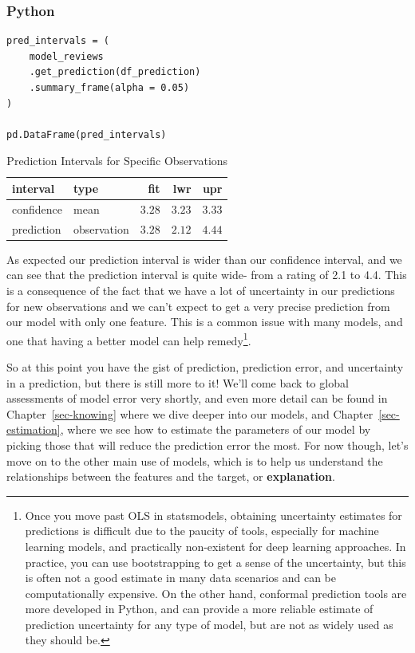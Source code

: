 \documentclass[
  letterpaper,
]{krantz}
\begin{document}
\subsubsection{Python}

\begin{verbatim}
pred_intervals = (
    model_reviews
    .get_prediction(df_prediction)
    .summary_frame(alpha = 0.05)
)

pd.DataFrame(pred_intervals)
\end{verbatim}

\begin{longtable}{llrrr}

\caption{\label{tbl-prediction-intervals}Prediction Intervals for
Specific Observations}

\tabularnewline

\toprule
interval & type & fit & lwr & upr \\ 
\midrule\addlinespace[2.5pt]
confidence & mean & \textcolor[HTML]{404040}{$3.28$} & \textcolor[HTML]{404040}{$3.23$} & \textcolor[HTML]{404040}{$3.33$} \\ 
prediction & observation & \textcolor[HTML]{404040}{$3.28$} & \textcolor[HTML]{404040}{$2.12$} & \textcolor[HTML]{404040}{$4.44$} \\ 
\bottomrule

\end{longtable}

As expected our prediction interval is wider than our confidence
interval, and we can see that the prediction interval is quite wide-
from a rating of 2.1 to 4.4. This is a consequence of the fact that we
have a lot of uncertainty in our predictions for new observations and we
can't expect to get a very precise prediction from our model with only
one feature. This is a common issue with many models, and one that
having a better model can help remedy\footnote{Once you move past OLS in
  statsmodels, obtaining uncertainty estimates for predictions is
  difficult due to the paucity of tools, especially for machine learning
  models, and practically non-existent for deep learning approaches. In
  practice, you can use bootstrapping to get a sense of the uncertainty,
  but this is often not a good estimate in many data scenarios and can
  be computationally expensive. On the other hand, conformal prediction
  tools are more developed in Python, and can provide a more reliable
  estimate of prediction uncertainty for any type of model, but are not
  as widely used as they should be.}.

So at this point you have the gist of prediction, prediction error, and
uncertainty in a prediction, but there is still more to it! We'll come
back to global assessments of model error very shortly, and even more
detail can be found in Chapter~\ref{sec-knowing} where we dive deeper
into our models, and Chapter~\ref{sec-estimation}, where we see how to
estimate the parameters of our model by picking those that will reduce
the prediction error the most. For now though, let's move on to the
other main use of models, which is to help us understand the
relationships between the features and the target, or
\textbf{explanation}.
\end{document}
